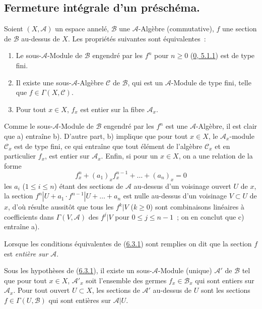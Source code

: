 \subsection{Fermeture intégrale d'un préschéma.}
\label{subsection:II.6.3-fr}

\begin{proposition}[6.3.1]
\label{II.6.3.1-fr}
Soient $(X,\mathcal{A})$ un espace annelé, $\mathcal{B}$ une
$\mathcal{A}$-Algèbre (commutative), $f$ une section de $\mathcal{B}$
au-dessus de $X$. Les propriétés suivantes sont équivalentes~:
\begin{enumerate}
\item[a)] Le sous-$\mathcal{A}$-Module de $\mathcal{B}$ engendré par les
$f^n$ pour $n\geq 0$ (\hyperref[0.5.1.1-fr]{0, 5.1.1}) est de type fini.
\item[b)] Il existe une sous-$\mathcal{A}$-Algèbre $\mathcal{C}$ de
$\mathcal{B}$, qui est un $\mathcal{A}$-Module de type fini, telle que
$f\in\Gamma(X,\mathcal{C})$.
\item[c)] Pour tout $x\in X$, $f_x$ est entier sur la fibre
$\mathcal{A}_x$.
\end{enumerate}
\end{proposition}


Comme le sous-$\mathcal{A}$-Module de $\mathcal{B}$ engendré par les $f^n$ est
une $\mathcal{A}$-Algèbre, il est clair que a) entraîne b). D'autre part, b)
implique que pour tout $x\in X$, le $\mathcal{A}_x$-module $\mathcal{C}_x$ est
de type fini, ce qui entraîne que tout élément de l'algèbre $\mathcal{C}_x$ et
en particulier $f_x$, est entier sur $\mathcal{A}_x$. Enfin, si pour un
$x\in X$, on a une relation de la forme
\[
f_x^n+(a_1)_xf_x^{n-1}+\ldots+(a_n)_x=0
\]
les $a_i$ ($1\leq i\leq n$) étant des sections de $\mathcal{A}$ au-dessus
d'un voisinage ouvert $U$ de $x$, la section
$f^n|U+a_1\cdot f^{n-1}|U+\ldots+a_n$ est nulle au-dessus d'un voisinage
$V\subset U$ de $x$, d'où résulte aussitôt que tous les $f^k|V$ ($k\geq0$)
sont combinaisons linéaires à coefficients dans $\Gamma(V,\mathcal{A})$ des
$f^j|V$ pour $0\leq j\leq n-1$~; on en conclut que c) entraîne a).

Lorsque les conditions équivalentes de (\hyperref[II.6.3.1-fr]{6.3.1}) sont
remplies on dit que la section $f$ est \emph{entière sur $\mathcal{A}$}.

\begin{corollary}[6.3.2]
\label{II.6.3.2-fr}
Sous les hypothèses de (\hyperref[II.6.3.1-fr]{6.3.1}), il existe un
sous-$\mathcal{A}$-Module (unique) $\mathcal{A}'$ de $\mathcal{B}$ tel que pour
tout $x\in X$, $\mathcal{A}'_x$ soit l'ensemble des germes
$f_x\in\mathcal{B}_x$ qui sont entiers sur $\mathcal{A}_x$. Pour tout ouvert
$U\subset X$, les sections de $\mathcal{A}'$ au-dessus de $U$ sont les
sections $f\in\Gamma(U,\mathcal{B})$ qui sont entières sur
$\mathcal{A}|U$.
\end{corollary}

